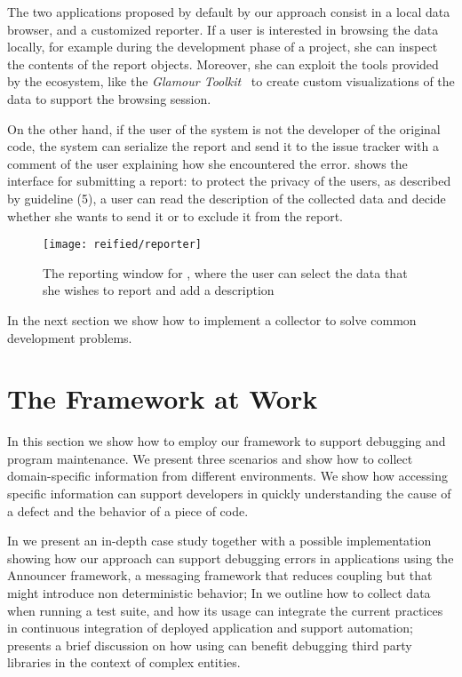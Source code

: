 The two applications proposed by default by our approach consist in a local data browser, and a customized reporter.
If a user is interested in browsing the data locally, for example during the development phase of a project, she can inspect the contents of the report objects.
Moreover, she can exploit the tools provided by the \pha ecosystem, like the \emph{Glamour Toolkit}~\cite{Girb2013a} to create custom visualizations of the data to support the browsing session.

On the other hand, if the user of the system is not the developer of the original code, the system can serialize the report and send it to the issue tracker with a comment of the user explaining how she encountered the error.
 shows the interface for submitting a report: to protect the privacy of the users, as described by guideline (5), a user can read the description of the collected data and decide whether she wants to send it or to exclude it from the report.

\begin{figure}[ht]
  \centering
  \texttt{[image: reified/reporter]}
  \caption{The reporting window for \sln, where the user can select the data that she wishes to report and add a description}
  \label{fig:reporter}
\end{figure}

In the next section we show how to implement a collector to solve common development problems.


\section{The Framework at Work}\label{sec:reified-stories}

In this section we show how to employ our framework to support debugging and program maintenance.
We present three scenarios and show how to collect domain-specific information from different environments.
We show how accessing specific information can support developers in quickly understanding the cause of a defect and the behavior of a piece of code.

In  we present an in-depth case study together with a possible implementation showing how our approach can support debugging errors in applications using the Announcer framework, a messaging framework that reduces coupling but that might introduce non deterministic behavior; In  we outline how to collect data when running a test suite, and how its usage can integrate the current practices in continuous integration of deployed application and support automation;  presents a brief discussion on how using \sln can benefit debugging third party libraries in the context of complex entities.

